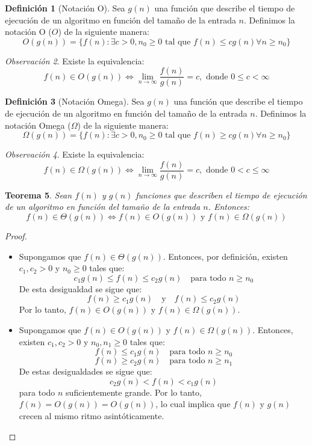 \documentclass{article}
\theoremstyle{definition}
\newtheorem{definition}{Definición}[section]
\theoremstyle{plain}
\newtheorem{theorem}[definition]{Teorema}
\theoremstyle{remark}
\newtheorem{remark}[definition]{Observación}
\begin{document}
\begin{definition}[Notación O]
Sea $g(n)$ una función que describe el tiempo de ejecución de un algoritmo en función del tamaño de la entrada $n$. Definimos la notación O ($O$) de la siguiente manera:
\[
O(g(n)) = \{ f(n) : \exists c > 0, n_0 \geq 0 \text{ tal que } f(n) \leq c g(n) \forall n \geq n_0 \}
\]
\end{definition}

\begin{remark}
Existe la equivalencia:
\[
f(n) \in O(g(n)) \iff \lim_{n \to \infty} \frac{f(n)}{g(n)} = c, \text{ donde } 0 \leq c < \infty
\]
\end{remark}

\begin{definition}[Notación Omega]
Sea $g(n)$ una función que describe el tiempo de ejecución de un algoritmo en función del tamaño de la entrada $n$. Definimos la notación Omega ($\Omega$) de la siguiente manera:
\[
\Omega(g(n)) = \{ f(n) : \exists c > 0, n_0 \geq 0 \text{ tal que } f(n) \geq c g(n) \forall n \geq n_0 \}
\]
\end{definition}

\begin{remark}
Existe la equivalencia:
\[
f(n) \in \Omega(g(n)) \iff \lim_{n \to \infty} \frac{f(n)}{g(n)} = c, \text{ donde } 0 < c \leq \infty
\]
\end{remark}

\begin{theorem}
Sean $f(n)$ y $g(n)$ funciones que describen el tiempo de ejecución de un algoritmo en función del tamaño de la entrada $n$. Entonces:
\[
f(n) \in \Theta(g(n)) \iff f(n) \in O(g(n)) \text{ y } f(n) \in \Omega(g(n))
\]
\end{theorem}

\begin{proof}
\begin{itemize}
  \item[$\Rightarrow$] Supongamos que $f(n) \in \Theta(g(n))$. Entonces, por definición, existen $c_1, c_2 > 0$ y $n_0 \geq 0$ tales que:
  \[
  c_1 g(n) \leq f(n) \leq c_2 g(n) \quad \text{para todo } n \geq n_0
  \]
  De esta desigualdad se sigue que:
  \[
  f(n) \geq c_1 g(n) \quad \text{y} \quad f(n) \leq c_2 g(n)
  \]
  Por lo tanto, $f(n) \in O(g(n))$ y $f(n) \in \Omega(g(n))$.

  \item[$\Leftarrow$] Supongamos que $f(n) \in O(g(n))$ y $f(n) \in \Omega(g(n))$. Entonces, existen $c_1, c_2 > 0$ y $n_0, n_1 \geq 0$ tales que:
  \[
  f(n) \leq c_1 g(n) \quad \text{para todo } n \geq n_0
  \]  
  \[
  f(n) \geq c_2 g(n) \quad \text{para todo } n \geq n_1
  \]
  De estas desigualdades se sigue que:
  \[
  c_2 g(n) < f(n) < c_1 g(n)
  \]
  para todo $n$ suficientemente grande. Por lo tanto, $f(n) = O(g(n)) = O(g(n))$, lo cual implica que $f(n)$ y $g(n)$ crecen al mismo ritmo asintóticamente.
\end{itemize}
\end{proof} 
\end{document}
